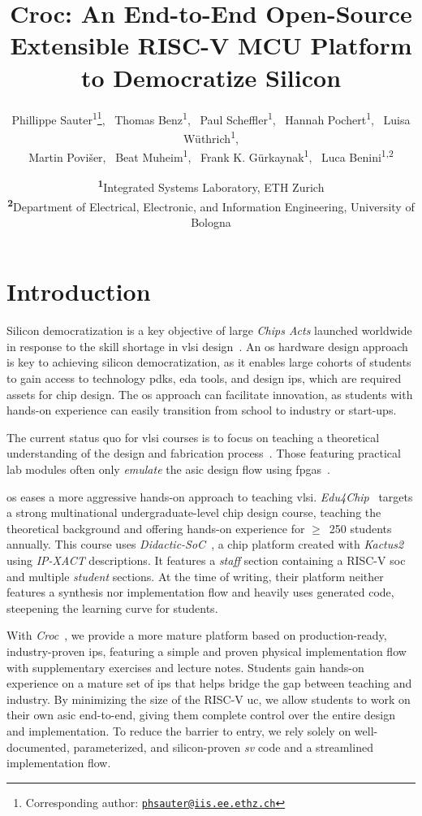 \documentclass[a4paper, 10pt, unnumberedsections, twoside]{LTJournalArticle}
\title{Croc: An End-to-End Open-Source Extensible RISC-V MCU Platform to Democratize Silicon}
\author{%
    Phillippe Sauter\textsuperscript{1}\thanks{Corresponding author: \href{mailto:phsauter@iis.ee.ethz.ch}{\tt phsauter@iis.ee.ethz.ch}}, \
    Thomas Benz\textsuperscript{1}, \
    Paul Scheffler\textsuperscript{1}, \
    Hannah Pochert\textsuperscript{1}, \
    Luisa Wüthrich\textsuperscript{1}, \\
    Martin Povišer, \
    Beat Muheim\textsuperscript{1}, \
    Frank K. Gürkaynak\textsuperscript{1}, \
    Luca Benini\textsuperscript{1,2}
}
\date{
    \vspace{-0.32em}
    \footnotesize\textsuperscript{\textbf{1}}Integrated Systems Laboratory, ETH Zurich \\
    \footnotesize\textsuperscript{\textbf{2}}Department of Electrical, Electronic, and
    Information Engineering, University of Bologna
    \vspace{-0.32em}
}
\newcommand{\riscv}{\mbox{RISC-V}}
\begin{document}
\maketitle

\glsresetall

\section{Introduction}

%
Silicon democratization is a key objective of large \emph{Chips Acts} launched worldwide in response to the skill shortage in \gls{vlsi} design~\cite{2024europeanchipsact, 2024chipsandscienceact, 2024indiainjects}.
%
An \gls{os} hardware design approach~\cite{2024importance, 2024edu4chips} is key to achieving silicon democratization, as it enables large cohorts of students to gain access to technology \glspl{pdk}, \gls{eda} tools, and design \glspl{ip}, which are required assets for chip design.
%
The \gls{os} approach can facilitate innovation, as students with hands-on experience can easily transition from school to industry or start-ups.

The current status quo for \gls{vlsi} courses is to focus on teaching a theoretical understanding of the design and fabrication process~\cite{2024edu4chips}.
%
Those featuring practical lab modules often only \emph{emulate} the \gls{asic} design flow using \glspl{fpga}~\cite{2024edu4chips}.

%
\Gls{os} eases a more aggressive hands-on approach to teaching \gls{vlsi}.
\emph{Edu4Chip}~\cite{2024edu4chips} targets a strong multinational undergraduate-level chip design course, teaching the theoretical background and offering hands-on experience for $\geq$~250 students annually. 
%
This course uses \emph{Didactic-SoC}~\cite{2024edu4chips}, a chip platform created with \emph{Kactus2} using \emph{IP-XACT} descriptions.
It features a \emph{staff} section containing a {\riscv} \gls{soc} and multiple \emph{student} sections.
%
At the time of writing, their platform neither features a synthesis nor implementation flow and heavily uses generated code, steepening the learning curve for students.

%
With \emph{Croc}~\cite{pulpplatform2024croc}, we provide a more mature platform based on production-ready, industry-proven \glspl{ip}, featuring a simple and proven physical implementation flow with supplementary exercises and lecture notes.
%
Students gain hands-on experience on a mature set of \glspl{ip} that helps bridge the gap between teaching and industry. 
%
By minimizing the size of the {\riscv} \gls{uc}, we allow students to work on their own \gls{asic} end-to-end, giving them complete control over the entire design and implementation. 
%
To reduce the barrier to entry, we rely solely on well-documented, parameterized, and silicon-proven \emph{\gls{sv}} code and a streamlined implementation flow.
\end{document}
